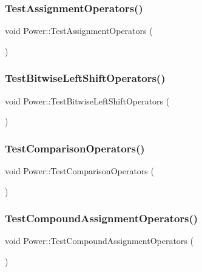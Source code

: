 \subsubsection{\texorpdfstring{Test\+Assignment\+Operators()}{TestAssignmentOperators()}}
{\footnotesize\ttfamily void Power\+::\+Test\+Assignment\+Operators (\begin{DoxyParamCaption}{ }\end{DoxyParamCaption})}

\mbox{\label{namespace_power_a3d6dfcf89602f4aa5f6c078f41a9a194}} 
\subsubsection{\texorpdfstring{Test\+Bitwise\+Left\+Shift\+Operators()}{TestBitwiseLeftShiftOperators()}}
{\footnotesize\ttfamily void Power\+::\+Test\+Bitwise\+Left\+Shift\+Operators (\begin{DoxyParamCaption}{ }\end{DoxyParamCaption})}

\mbox{\label{namespace_power_a93bc9ffcd35542cdc32911f0ab15240f}} 
\subsubsection{\texorpdfstring{Test\+Comparison\+Operators()}{TestComparisonOperators()}}
{\footnotesize\ttfamily void Power\+::\+Test\+Comparison\+Operators (\begin{DoxyParamCaption}{ }\end{DoxyParamCaption})}

\mbox{\label{namespace_power_a9980a95021b19e68741111b8d706f60d}} 
\subsubsection{\texorpdfstring{Test\+Compound\+Assignment\+Operators()}{TestCompoundAssignmentOperators()}}
{\footnotesize\ttfamily void Power\+::\+Test\+Compound\+Assignment\+Operators (\begin{DoxyParamCaption}{ }\end{DoxyParamCaption})}

